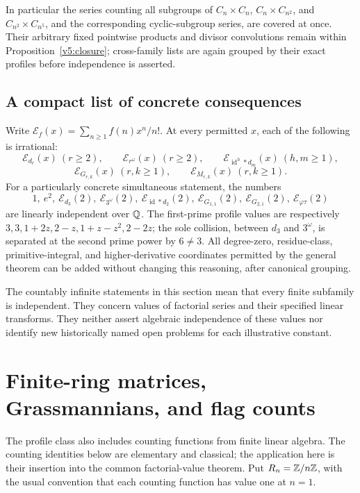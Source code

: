 In particular the series counting all subgroups of
$C_n\times C_n$, $C_n\times C_{n^2}$, and $C_{n^2}\times C_{n^5}$,
and the corresponding cyclic-subgroup series, are covered at once.
Their arbitrary fixed pointwise products and divisor convolutions
remain within Proposition~\ref{v5:closure}; cross-family lists are
again grouped by their exact profiles before independence is asserted.

\subsection{A compact list of concrete consequences}

Write $\mathcal E_f(x)=\sum_{n\geq1}f(n)x^n/n!$.
At every permitted $x$, each of the following is irrational:
\[
 \mathcal E_{d_r}(x)\ (r\geq2),\qquad
 \mathcal E_{r^{\omega}}(x)\ (r\geq2),\qquad
 \mathcal E_{\operatorname{id}^{h}*d_m}(x)\ (h,m\geq1),
\]
\[
 \mathcal E_{G_{r,k}}(x)\ (r,k\geq1),\qquad
 \mathcal E_{M_{r,k}}(x)\ (r,k\geq1).
\]
For a particularly concrete simultaneous statement, the numbers
\[
 1,\ e^2,\ \mathcal E_{d_3}(2),\ \mathcal E_{3^{\omega}}(2),\
 \mathcal E_{\operatorname{id}*d_2}(2),\
 \mathcal E_{G_{1,1}}(2),\ \mathcal E_{G_{2,1}}(2),\
 \mathcal E_{\varphi\tau}(2)
\]
are linearly independent over $\mathbb Q$.
The first-prime profile values are respectively
$3,3,1+2z,2-z,1+z-z^2,2-2z$; the sole collision, between $d_3$
and $3^{\omega}$, is separated at the second prime power by $6\ne3$.
All degree-zero, residue-class, primitive-integral, and higher-derivative
coordinates permitted by the general theorem can be added without
changing this reasoning, after canonical grouping.

The countably infinite statements in this section mean that every
finite subfamily is independent.  They concern values of factorial
series and their specified linear transforms.  They neither assert
algebraic independence of these values nor identify new historically
named open problems for each illustrative constant.

\section{Finite-ring matrices, Grassmannians, and flag counts}
\label{sec:v5-finite-geometry}

The profile class also includes counting functions from finite linear
algebra.  The counting identities below are elementary and classical;
the application here is their insertion into the common factorial-value
theorem.  Put $R_n=\mathbb Z/n\mathbb Z$, with the usual convention that each counting
function has value one at $n=1$.

